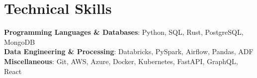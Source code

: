 \section{Technical Skills}
    \begin{itemize}[leftmargin=0.15in, label={}]
	\small{
        \item{
		\textbf{Programming Languages \& Databases}{: Python, SQL, Rust, PostgreSQL, MongoDB}\\
        \vspace{0.1cm}
        \textbf{Data Engineering \& Processing}{: Databricks, PySpark, Airflow, Pandas, ADF} \\
        \vspace{0.1cm}
        \textbf{Miscellaneous}{: Git, AWS, Azure, Docker, Kubernetes, FastAPI, GraphQL, React} \\
        }
    }
    \end{itemize}